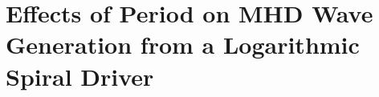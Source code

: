 
\chapter{Effects of Period on MHD Wave Generation from a Logarithmic Spiral Driver}\label{ch:period}